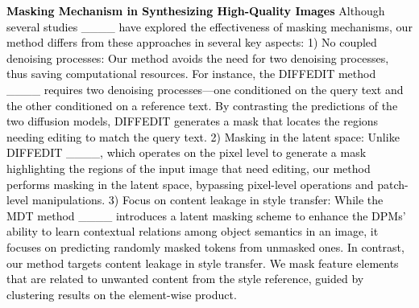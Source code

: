 \textcolor{black}{\textbf{Masking Mechanism in Synthesizing High-Quality Images}
Although several studies ____ have explored the effectiveness of masking mechanisms, our method differs from these approaches in several key aspects:
1) No coupled denoising processes: Our method avoids the need for two denoising processes, thus saving computational resources. For instance, the DIFFEDIT method ____ requires two denoising processes—one conditioned on the query text and the other conditioned on a reference text. By contrasting the predictions of the two diffusion models, DIFFEDIT generates a mask that locates the regions needing editing to match the query text.
2) Masking in the latent space: Unlike DIFFEDIT ____, which operates on the pixel level to generate a mask highlighting the regions of the input image that need editing, our method performs masking in the latent space, bypassing pixel-level operations and patch-level manipulations.
3) Focus on content leakage in style transfer: While the MDT method ____ introduces a latent masking scheme to enhance the DPMs' ability to learn contextual relations among object semantics in an image, it focuses on predicting randomly masked tokens from unmasked ones. In contrast, our method targets content leakage in style transfer. We mask feature elements that are related to unwanted content from the style reference, guided by clustering results on the element-wise product. 
}